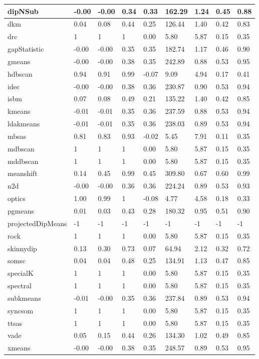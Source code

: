 \begin{table}[H]
\begin{tabular}{|l|l|l|l|l|l|l|l|l|}
\hline
dipNSub & -0.00 & -0.00 & 0.34 & 0.33 & 162.29 & 1.24 & 0.45 & 0.88 \\
\hline
dkm & 0.04 & 0.08 & 0.44 & 0.25 & 126.44 & 1.40 & 0.42 & 0.83 \\
\hline
drc & 1 & 1 & 1 & 0.00 & 5.80 & 5.87 & 0.15 & 0.35 \\
\hline
gapStatistic & -0.00 & -0.00 & 0.35 & 0.35 & 182.74 & 1.17 & 0.46 & 0.90 \\
\hline
gmeans & -0.00 & -0.00 & 0.38 & 0.35 & 242.89 & 0.88 & 0.53 & 0.95 \\
\hline
hdbscan & 0.94 & 0.91 & 0.99 & -0.07 & 9.09 & 4.94 & 0.17 & 0.41 \\
\hline
idec & -0.00 & -0.00 & 0.38 & 0.36 & 230.87 & 0.90 & 0.53 & 0.94 \\
\hline
isbm & 0.07 & 0.08 & 0.49 & 0.21 & 135.22 & 1.40 & 0.42 & 0.85 \\
\hline
kmeans & -0.01 & -0.01 & 0.35 & 0.36 & 237.59 & 0.88 & 0.53 & 0.94 \\
\hline
ldakmeans & -0.01 & -0.01 & 0.35 & 0.36 & 238.03 & 0.89 & 0.53 & 0.94 \\
\hline
mbsas & 0.81 & 0.83 & 0.93 & -0.02 & 5.45 & 7.91 & 0.11 & 0.35 \\
\hline
mdbscan & 1 & 1 & 1 & 0.00 & 5.80 & 5.87 & 0.15 & 0.35 \\
\hline
mddbscan & 1 & 1 & 1 & 0.00 & 5.80 & 5.87 & 0.15 & 0.35 \\
\hline
meanshift & 0.14 & 0.45 & 0.99 & 0.45 & 309.80 & 0.67 & 0.60 & 0.99 \\
\hline
n2d & -0.00 & -0.00 & 0.36 & 0.36 & 224.24 & 0.89 & 0.53 & 0.93 \\
\hline
optics & 1.00 & 0.99 & 1 & -0.08 & 4.77 & 4.58 & 0.18 & 0.33 \\
\hline
pgmeans & 0.01 & 0.03 & 0.43 & 0.28 & 180.32 & 0.95 & 0.51 & 0.90 \\
\hline
projectedDipMeans & -1 & -1 & -1 & -1 & -1 & -1 & -1 & -1 \\
\hline
rock & 1 & 1 & 1 & 0.00 & 5.80 & 5.87 & 0.15 & 0.35 \\
\hline
skinnydip & 0.13 & 0.30 & 0.73 & 0.07 & 64.94 & 2.12 & 0.32 & 0.72 \\
\hline
somsc & 0.04 & 0.04 & 0.48 & 0.25 & 134.91 & 1.13 & 0.47 & 0.85 \\
\hline
specialK & 1 & 1 & 1 & 0.00 & 5.80 & 5.87 & 0.15 & 0.35 \\
\hline
spectral & 1 & 1 & 1 & 0.00 & 5.80 & 5.87 & 0.15 & 0.35 \\
\hline
subkmeans & -0.01 & -0.00 & 0.35 & 0.36 & 237.84 & 0.89 & 0.53 & 0.94 \\
\hline
syncsom & 1 & 1 & 1 & 0.00 & 5.80 & 5.87 & 0.15 & 0.35 \\
\hline
ttsas & 1 & 1 & 1 & 0.00 & 5.80 & 5.87 & 0.15 & 0.35 \\
\hline
vade & 0.05 & 0.15 & 0.44 & 0.26 & 134.30 & 1.02 & 0.49 & 0.85 \\
\hline
xmeans & -0.00 & -0.00 & 0.38 & 0.35 & 248.57 & 0.89 & 0.53 & 0.95 \\
\hline
\end{tabular}
\end{table}



